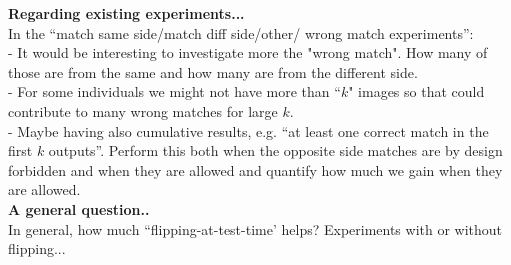 \documentclass[11pt, twoside]{article}
\begin{document}
\noindent
\textbf{Regarding existing experiments...}\\
In the ``match same side/match diff side/other/ wrong match experiments'': \\
- It would be interesting to investigate more the "wrong match". How many of those are from the same and how many are from the different side.\\
- For some individuals we might not have more than ``$k$" images so that could contribute to many wrong matches for large $k$.\\
- Maybe having also cumulative results, e.g. ``at least one correct match in the first $k$ outputs''. Perform this both when the opposite side matches are by design forbidden and when they are allowed and quantify how much we gain when they are allowed.\\

\noindent
\textbf{A general question..}\\
In general, how much ``flipping-at-test-time' helps? Experiments with or without flipping...
\end{document}

